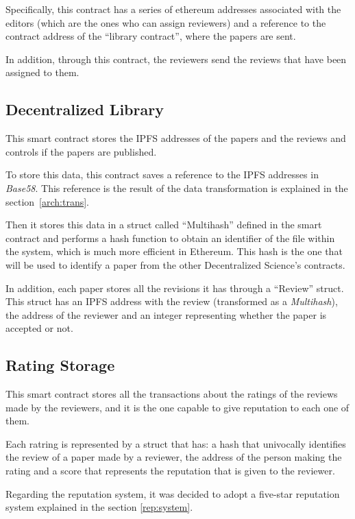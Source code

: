 Specifically, this contract has a series of ethereum addresses associated with
the editors (which are the ones who can assign reviewers) and a reference to the
contract address of the ``library contract'', where the papers are sent.

In addition, through this contract, the reviewers send the reviews that have
been assigned to them.

\subsection*{Decentralized Library}
\label{sec:decentr-libr}

This smart contract stores the IPFS addresses of the papers and the reviews and
controls if the papers are published.

To store this data, this contract saves a reference to the IPFS addresses in
\emph{Base58}. This reference is the result of the data transformation is
explained in the section~\ref{arch:trans}.

Then it stores this data in a struct called ``Multihash'' defined in the smart
contract and performs a hash function to obtain an identifier of the file within
the system, which is much more efficient in Ethereum. This hash is the one that
will be used to identify a paper from the other Decentralized Science's
contracts.

In addition, each paper stores all the revisions it has through a ``Review''
struct. This struct has an IPFS address with the review (transformed as a
\emph{Multihash}), the address of the reviewer and an integer representing
whether the paper is accepted or not.

\subsection*{Rating Storage}
\label{sec:rating-storage}

This smart contract stores all the transactions about the ratings of the reviews
made by the reviewers, and it is the one capable to give reputation to each one
of them.

Each ratring is represented by a struct that has: a hash that univocally
identifies the review of a paper made by a reviewer, the address of the person
making the rating and a score that represents the reputation that is given to
the reviewer.

Regarding the reputation system, it was decided to adopt a five-star reputation
system explained in the section \ref{rep:system}.

